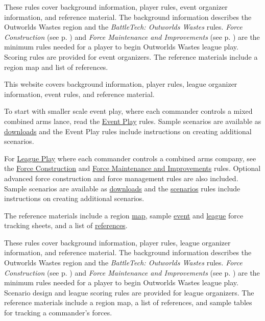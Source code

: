  {
These rules cover background information, player rules, event organizer information, and reference material.
The background information describes the Outworlds Wastes region and the \emph{BattleTech: Outworlds Wastes} rules.
\emph{Force Construction} (see p. \pageref{subsec:event_force_construction}) and \emph{Force Maintenance and Improvements} (see p. \pageref{subsec:event_force_maintenance}) are the minimum rules needed for a player to begin Outworlds Wastes league play.
Scoring rules are provided for event organizers.
The reference materials include a region map and list of references.
} {
 {
This website covers background information, player rules, league organizer information, event rules, and reference material.

To start with smaller scale event play, where each commander controls a mixed combined arms lance, read the \hyperref[sec:event_play]{Event Play} rules.
Sample scenarios are available as \hyperref[sec:downloads]{downloads} and the Event Play rules include instructions on creating additional scenarios.

For \hyperref[sec:league_play]{League Play} where each commander controls a combined arms company, see the \hyperref[subsec:force_construction]{Force Construction} and \hyperref[subsec:force_maintenance]{Force Maintenance and Improvements} rules.
Optional advanced force construction and force management rules are also included.
Sample scenarios are available as \hyperref[sec:downloads]{downloads} and the \hyperref[sec:scenarios]{scenarios} rules include instructions on creating additional scenarios.

The reference materials include a region \hyperref[sec:outworlds_wastes_map]{map}, sample \hyperref[sec:sample_tracking_event]{event} and \hyperref[sec:sample_tracking]{league} force tracking sheets, and a list of \hyperref[sec:references]{references}.
} {
These rules cover background information, player rules, league organizer information, and reference material.
The background information describes the Outworlds Wastes region and the \emph{BattleTech: Outworlds Wastes} rules.
\emph{Force Construction} (see p. \pageref{subsec:force_construction}) and \emph{Force Maintenance and Improvements} (see p. \pageref{subsec:force_maintenance}) are the minimum rules needed for a player to begin Outworlds Wastes league play.
Scenario design and league scoring rules are provided for league organizers.
The reference materials include a region map, a list of references, and sample tables for tracking a commander's forces.
}}

